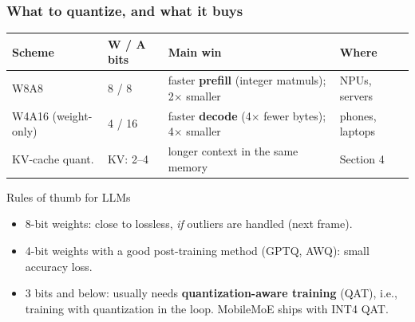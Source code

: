 \begin{frame}
\frametitle{What to quantize, and what it buys}
\vspace{4pt}
\centering
\small
\begin{tabular}{@{}llll@{}}
\toprule
Scheme & W / A bits & Main win & Where \\
\midrule
W8A8 & 8 / 8 & faster \textbf{prefill} (integer matmuls); 2$\times$ smaller & NPUs, servers \\
W4A16 (weight-only) & 4 / 16 & faster \textbf{decode} (4$\times$ fewer bytes); 4$\times$ smaller & phones, laptops \\
KV-cache quant. & KV: 2--4 & longer context in the same memory & Section 4 \\
\bottomrule
\end{tabular}
\normalsize
\raggedright
\vspace{12pt}
\begin{block}{Rules of thumb for LLMs}
\begin{itemize}
  \item 8-bit weights: close to lossless, \emph{if} outliers are handled (next frame).
  \item 4-bit weights with a good post-training method (GPTQ, AWQ): small accuracy loss.
  \item 3 bits and below: usually needs \textbf{quantization-aware training} (QAT), i.e., training with quantization in the loop. MobileMoE ships with INT4 QAT.
\end{itemize}
\end{block}
\end{frame}

